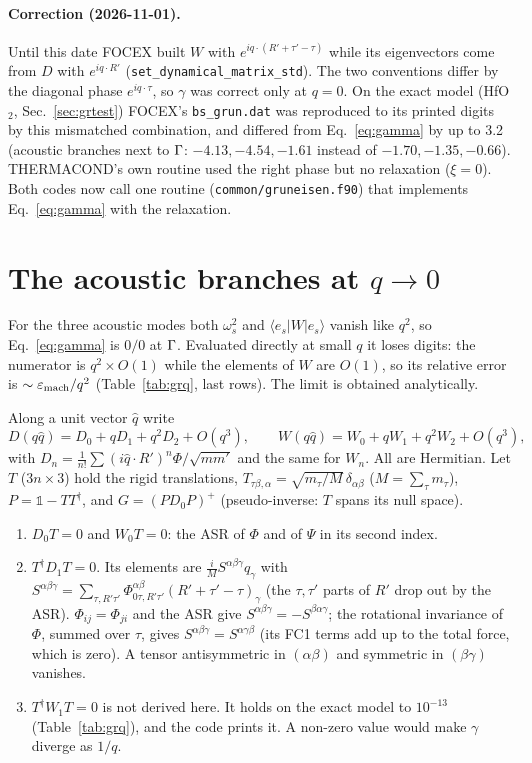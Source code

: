 \documentclass[11pt,a4paper]{article}
\newcommand{\al}{\alpha}\newcommand{\be}{\beta}\newcommand{\ga}{\gamma}\newcommand{\de}{\delta}
\newcommand{\Id}{\mathbb{1}}
\begin{document}
\paragraph{Correction (2026-11-01).} Until this date FOCEX built $W$ with $e^{iq\cdot(R'+\tau'-\tau)}$ while
its eigenvectors come from $D$ with $e^{iq\cdot R'}$ (\texttt{set\_dynamical\_matrix\_std}). The two
conventions differ by the diagonal phase $e^{iq\cdot\tau}$, so $\ga$ was correct only at $q=0$. On the exact
model (HfO$_2$, Sec.~\ref{sec:grtest}) FOCEX's \texttt{bs\_grun.dat} was reproduced to its printed digits by
this mismatched combination, and differed from Eq.~\eqref{eq:gamma} by up to 3.2 (acoustic branches next to
$\Gamma$: $-4.13,-4.54,-1.61$ instead of $-1.70,-1.35,-0.66$). THERMACOND's own routine used the right phase but
no relaxation ($\xi=0$). Both codes now call one routine (\texttt{common/gruneisen.f90}) that implements
Eq.~\eqref{eq:gamma} with the relaxation.

\section{The acoustic branches at \texorpdfstring{$q\to0$}{q -> 0}}
For the three acoustic modes both $\omega_s^2$ and $\langle e_s|W|e_s\rangle$ vanish like $q^2$, so
Eq.~\eqref{eq:gamma} is $0/0$ at $\Gamma$. Evaluated directly at small $q$ it loses digits: the numerator is
$q^2\times O(1)$ while the elements of $W$ are $O(1)$, so its relative error is $\sim\varepsilon_{\rm mach}/q^2$
(Table~\ref{tab:grq}, last rows). The limit is obtained analytically.

Along a unit vector $\hat q$ write
\begin{equation}
D(q\hat q)=D_0+qD_1+q^2D_2+O(q^3),\qquad W(q\hat q)=W_0+qW_1+q^2W_2+O(q^3),
\end{equation}
with $D_n=\frac1{n!}\sum(i\hat q\cdot R')^n\Phi/\sqrt{mm'}$ and the same for $W_n$. All are Hermitian. Let
$T$ ($3n\times3$) hold the rigid translations, $T_{\tau\be,\al}=\sqrt{m_\tau/M}\,\de_{\al\be}$ ($M=\sum_\tau m_\tau$),
$P=\Id-TT^\dagger$, and $G=(PD_0P)^{+}$ (pseudo-inverse: $T$ spans its null space).
\begin{enumerate}
\item $D_0T=0$ and $W_0T=0$: the ASR of $\Phi$ and of $\Psi$ in its second index.
\item $T^\dagger D_1T=0$. Its elements are $\frac iM S^{\al\be\ga}\hat q_\ga$ with
  $S^{\al\be\ga}=\sum_{\tau,R'\tau'}\Phi^{\al\be}_{0\tau,R'\tau'}(R'+\tau'-\tau)_\ga$ (the $\tau,\tau'$ parts of
  $R'$ drop out by the ASR). $\Phi_{ij}=\Phi_{ji}$ and the ASR give $S^{\al\be\ga}=-S^{\be\al\ga}$; the rotational
  invariance of $\Phi$, summed over $\tau$, gives $S^{\al\be\ga}=S^{\al\ga\be}$ (its FC1 terms add up to the total
  force, which is zero). A tensor antisymmetric in $(\al\be)$ and symmetric in $(\be\ga)$ vanishes.
\item $T^\dagger W_1T=0$ is not derived here. It holds on the exact model to $10^{-13}$ (Table~\ref{tab:grq}),
  and the code prints it. A non-zero value would make $\ga$ diverge as $1/q$.
\end{enumerate}
\end{document}
